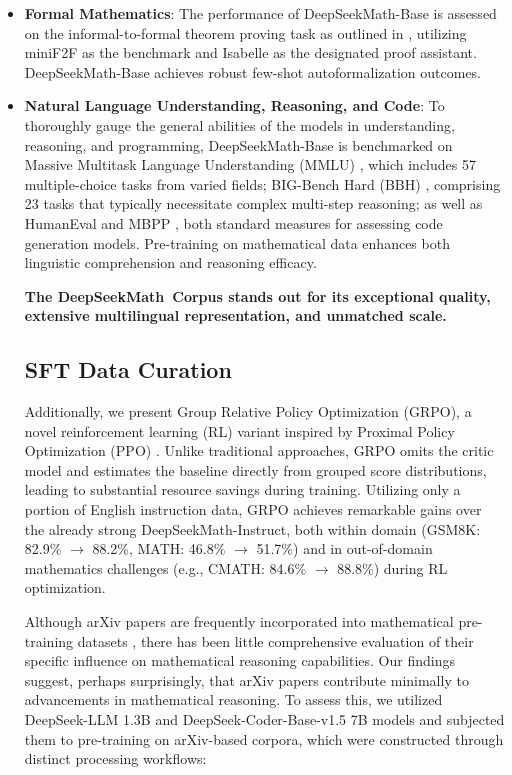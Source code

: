 \begin{itemize}[topsep=0pt]
\item \textbf{Formal Mathematics}: The performance of DeepSeekMath-Base is assessed on the informal-to-formal theorem proving task as outlined in \citep{dsp_proof}, utilizing miniF2F \citep{minif2f} as the benchmark and Isabelle \citep{isabelle} as the designated proof assistant. DeepSeekMath-Base achieves robust few-shot autoformalization outcomes.
\item \textbf{Natural Language Understanding, Reasoning, and Code}: To thoroughly gauge the general abilities of the models in understanding, reasoning, and programming, DeepSeekMath-Base is benchmarked on Massive Multitask Language Understanding (MMLU) \citep{mmlu}, which includes 57 multiple-choice tasks from varied fields; BIG-Bench Hard (BBH) \citep{bbh}, comprising 23 tasks that typically necessitate complex multi-step reasoning; as well as HumanEval \citep{codex} and MBPP \citep{mbpp}, both standard measures for assessing code generation models. Pre-training on mathematical data enhances both linguistic comprehension and reasoning efficacy.

\textbf{The DeepSeekMath~Corpus stands out for its exceptional quality, extensive multilingual representation, and unmatched scale.}

\subsection{SFT Data Curation}

Additionally, we present Group Relative Policy Optimization (GRPO), a novel reinforcement learning (RL) variant inspired by Proximal Policy Optimization (PPO) \citep{schulman2017proximal}. Unlike traditional approaches, GRPO omits the critic model and estimates the baseline directly from grouped score distributions, leading to substantial resource savings during training. Utilizing only a portion of English instruction data, GRPO achieves remarkable gains over the already strong DeepSeekMath-Instruct, both within domain (GSM8K: 82.9\% $\rightarrow$ 88.2\%, MATH: 46.8\% $\rightarrow$ 51.7\%) and in out-of-domain mathematics challenges (e.g., CMATH: 84.6\% $\rightarrow$ 88.8\%) during RL optimization. 

Although arXiv papers are frequently incorporated into mathematical pre-training datasets \citep{minerva,gpt-f,llemma,mathpile}, there has been little comprehensive evaluation of their specific influence on mathematical reasoning capabilities. Our findings suggest, perhaps surprisingly, that arXiv papers contribute minimally to advancements in mathematical reasoning. To assess this, we utilized DeepSeek-LLM 1.3B and DeepSeek-Coder-Base-v1.5 7B \citep{deepseek-coder} models and subjected them to pre-training on arXiv-based corpora, which were constructed through distinct processing workflows:


\end{itemize}
